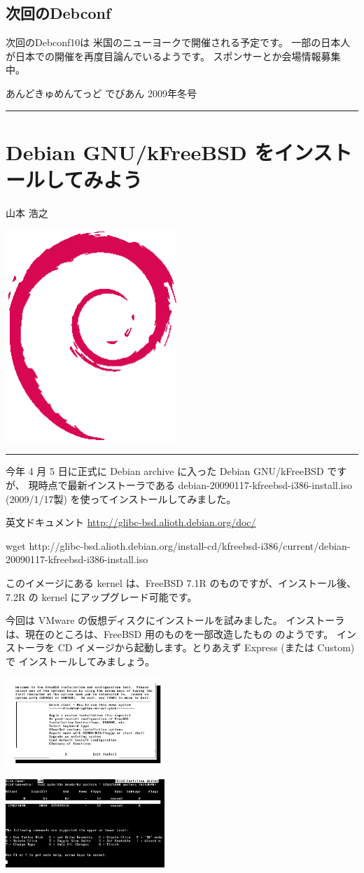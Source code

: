 \documentclass[mingoth,a4paper]{jsarticle}
\renewcommand{\dancersection}[2]{%
\newpage
あんどきゅめんてっど でびあん 2009年冬号
%
\vspace{0.1mm}\\
{\color{dancerlightblue}\rule{\hsize}{2mm}}

%
%
\begin{minipage}[t]{0.6\hsize}
\color{dancerdarkblue}
\vspace{1cm}
\section{#1}
\hfill{}#2\\
\end{minipage}
\begin{minipage}[t]{0.4\hsize}
\vspace{-2cm}
\hfill{}\includegraphics[height=8cm]{image200502/openlogo-nd.eps}\\
\vspace{-5cm}
\end{minipage}
%
%
{\color{dancerdarkblue}\rule{0.74\hsize}{2mm}}
%
\vspace{2cm}
}
\begin{document}
\subsection{次回のDebconf}
次回のDebconf10は 米国のニューヨークで開催される予定です。
一部の日本人が日本での開催を再度目論んでいるようです。
スポンサーとか会場情報募集中。

\dancersection{Debian GNU/kFreeBSD をインストールしてみよう}{山本 浩之}

今年 4 月 5 日に正式に Debian archive に入った Debian GNU/kFreeBSD ですが、
現時点で最新インストーラである debian-20090117-kfreebsd-i386-install.iso 
(2009/1/17製) を使ってインストールしてみました。

英文ドキュメント
\url{http://glibc-bsd.alioth.debian.org/doc/}

\begin{commandline}
wget http://glibc-bsd.alioth.debian.org/install-cd/kfreebsd-i386/current/debian-20090117-kfreebsd-i386-install.iso
\end{commandline}

このイメージにある kernel は、FreeBSD 7.1R のものですが、インストール後、
7.2R の kernel にアップグレード可能です。

今回は VMware の仮想ディスクにインストールを試みました。
インストーラは、現在のところは、FreeBSD 用のものを一部改造したもの
のようです。
インストーラを CD イメージから起動します。とりあえず Express (または Custom)で
インストールしてみましょう。

\begin{minipage}{0.4\hsize}
\includegraphics[width=6cm]{image200906/kfreebsd02_mono.png}
\end{minipage}
\begin{minipage}{0.4\hsize}
\includegraphics[width=6cm]{image200906/kfreebsd03_mono.png}
\end{minipage}
\end{document}
